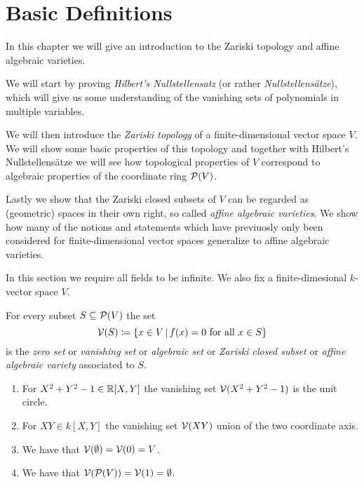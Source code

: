 \section{Basic Definitions}


\begin{fluff}
  In this chapter we will give an introduction to the Zariski topology and affine algebraic varieties.
  
  We will start by proving \emph{Hilbert’s Nullstellensatz} (or rather \emph{Nullstellensätze}), which will give us some understanding of the vanishing sets of polynomials in multiple variables.
  
  We will then introduce the \emph{Zariski topology} of a finite-dimensional vector space $V$.
  We will show some basic properties of this topology and together with Hilbert’s Nullstellensätze we will see how topological properties of $V$ correspond to algebraic properties of the coordinate ring $\mathcal{P}(V)$.
  
  Lastly we show that the Zariski closed subsets of $V$ can be regarded as (geometric) spaces in their own right, so called \emph{affine algebraic varieties}.
  We show how many of the notions and statements which have previuosly only been considered for finite-dimensional vector spaces generalize to affine algebraic varieties.
\end{fluff}


\begin{conventions}
  In this section we require all fields to be infinite.
  We also fix a finite-dimesional $k$-vector space $V$.
\end{conventions}


\begin{definition}
  For every subset $S \subseteq \mathcal{P}(V)$ the set
  \[
              \mc{V}(S)
    \defined  \{
                x \in V
              \suchthat
                \text{$f(x) = 0$ for all $x \in S$}
              \}
  \]
  is the \emph{zero set} or \emph{vanishing set} or \emph{algebraic set} or \emph{Zariski closed subset} or \emph{affine algebraic variety} associated to $S$.
\end{definition}


\begin{example}
  \label{example: examples of algebraic subsets}
  \leavevmode
  \begin{enumerate}
    \item
      For $X^2 + Y^2 - 1 \in \mathbb{R}[X,Y]$ the vanishing set $\mathcal{V}(X^2 + Y^2 - 1)$ is the unit circle.
    \item
      For $XY \in k[X,Y]$ the vanishing set $\mathcal{V}(XY)$ union of the two coordinate axis.
    \item
      We have that $\mathcal{V}(\emptyset) = \mathcal{V}(0) = V$.
    \item
      We have that $\mathcal{V}(\mathcal{P}(V)) = \mathcal{V}(1) = \emptyset$.
  \end{enumerate}
\end{example}


